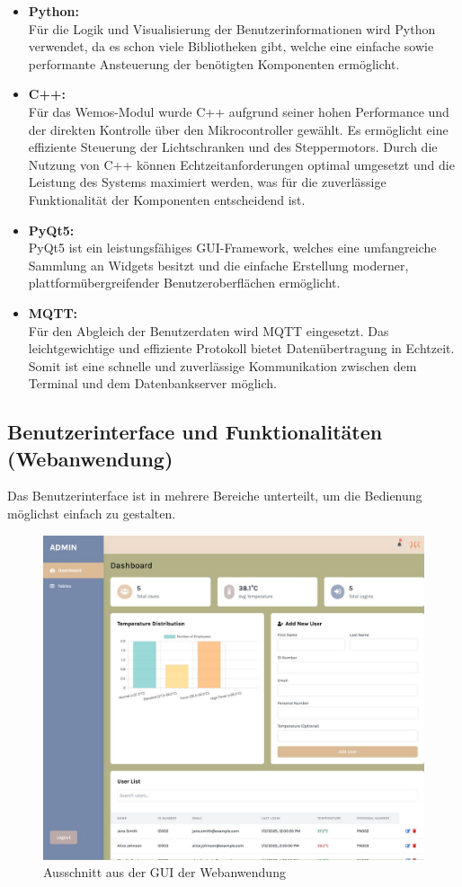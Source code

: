 \begin{itemize}
    \item \textbf{Python:}\\
    Für die Logik und Visualisierung der Benutzerinformationen wird Python verwendet, da es schon viele Bibliotheken gibt, welche eine einfache sowie performante Ansteuerung der benötigten Komponenten ermöglicht.
    \item \textbf{C++:}\\
    Für das Wemos-Modul wurde C++ aufgrund seiner hohen Performance und der direkten Kontrolle über den Mikrocontroller gewählt. Es ermöglicht eine effiziente Steuerung der Lichtschranken und des Steppermotors. Durch die Nutzung von C++ können Echtzeitanforderungen optimal umgesetzt und die Leistung des Systems maximiert werden, was für die zuverlässige Funktionalität der Komponenten entscheidend ist.
    \item \textbf{PyQt5:}\\
    PyQt5 ist ein leistungsfähiges GUI-Framework, welches eine umfangreiche Sammlung an Widgets besitzt und die einfache Erstellung moderner, plattformübergreifender Benutzeroberflächen ermöglicht.
    \item \textbf{MQTT:}\\
    Für den Abgleich der Benutzerdaten wird MQTT eingesetzt. Das leichtgewichtige und effiziente Protokoll bietet Datenübertragung in Echtzeit. Somit ist eine schnelle und zuverlässige Kommunikation zwischen dem Terminal und dem Datenbankserver möglich. 
\end{itemize}

\subsection{Benutzerinterface und Funktionalitäten (Webanwendung)}

Das Benutzerinterface ist in mehrere Bereiche unterteilt, um die Bedienung möglichst einfach zu gestalten. 

\begin{figure}[h]
	\centering
	\includegraphics[width=0.7\linewidth]{figures/GUI.jpeg}
	\caption[GUI]{Ausschnitt aus der GUI der Webanwendung}\label{fig:gui}
\end{figure}

